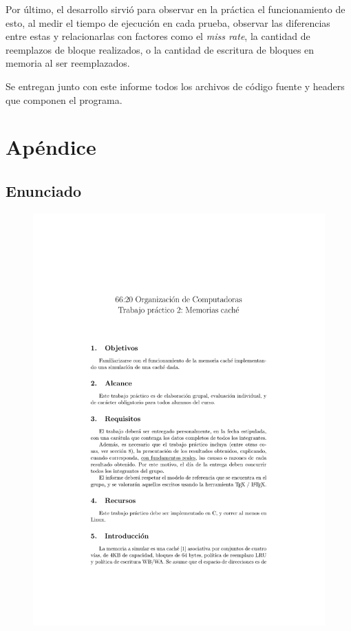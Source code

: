 \documentclass[a4paper, 12pt]{article}
\begin{document}
		Por último, el desarrollo sirvió para observar en la práctica el funcionamiento de esto, al medir el tiempo de ejecución en cada prueba, observar las diferencias entre estas y relacionarlas con factores como el \textit{miss rate}, la cantidad de reemplazos de bloque realizados, o la cantidad de escritura de bloques en memoria al ser reemplazados.
		
		Se entregan junto con este informe todos los archivos de código fuente y headers que componen el programa.
		
	\newpage
	\section{Apéndice}
	\subsection{Enunciado}

	\begin{figure}[H]
		\centering
		\includegraphics[scale=1, page = 1, clip, trim=1.5in 1.5in 20mm 2in]{files/tp2-c2-2018.pdf}
	\end{figure}
	
\end{document}
